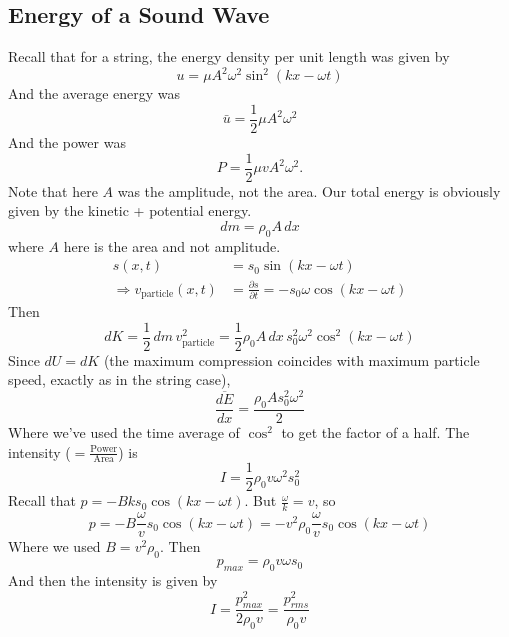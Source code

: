 \documentclass{report}
\numberwithin{equation}{section}
\newcommand{\pd}[2]{\frac{\partial #1}{\partial #2}}
\begin{document}
\subsection{Energy of a Sound Wave}
Recall that for a string, the energy density per unit length was given by
\begin{equation*}
	u = \mu A^2\omega^2\sin^2(kx-\omega t)
\end{equation*}
And the average energy was
\begin{equation*}
	\bar{u} = \frac{1}{2}\mu A^2\omega^2
\end{equation*}
And the power was
\begin{equation*}
	P = \frac{1}{2}\mu vA^2\omega^2.
\end{equation*}
Note that here $A$ was the amplitude, not the area. Our total energy is obviously given by the kinetic + potential energy.
\begin{equation}
	dm = \rho_0 A\, dx
\end{equation}
where $A$ here is the area and not amplitude.
\begin{align*}
	s(x,t) &= s_0\sin(kx-\omega t)\\
	\Rightarrow v_{\text{particle}}(x,t) &= \pd{s}{t} = -s_0\omega\cos(kx-\omega t)
\end{align*}
Then
\begin{equation}
	dK = \frac{1}{2}\,dm\,v_{\text{particle}}^2 = \frac{1}{2} \rho_0 A\, dx\, s_0^2\omega^2\cos^2(kx-\omega t)
\end{equation}
Since $dU = dK$ (the maximum compression coincides with maximum particle speed, exactly as in the string case),
\begin{equation}
	\frac{\overline{dE}}{dx} = \frac{\rho_0 A s_0^2\omega^2}{2}
\end{equation}
Where we've used the time average of $\cos^2$ to get the factor of a half. The intensity ($= \frac{\text{Power}}{\text{Area}}$) is
\begin{equation}
	I = \frac{1}{2}\rho_0 v\omega^2 s_0^2
\end{equation}
Recall that $p = -Bk s_0\cos(kx-\omega t)$. But $\frac{\omega}{k} = v$, so
\begin{equation}
	p = -B\frac{\omega}{v}s_0\cos(kx-\omega t) = -v^2\rho_0\frac{\omega}{v}s_0\cos(kx-\omega t)
\end{equation}
Where we used $B = v^2\rho_0$. Then
\begin{equation}
	p_{max} = \rho_0 v\omega s_0
\end{equation}
And then the intensity is given by
\begin{equation}
	I = \frac{p_{max}^2}{2\rho_0 v} = \frac{p_{rms}^2}{\rho_0 v}
\end{equation}
\end{document}

